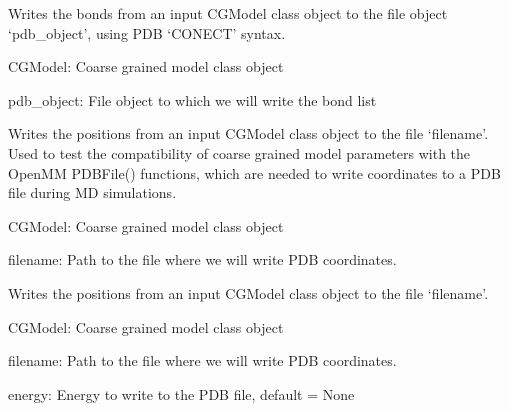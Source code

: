 \documentclass[letterpaper,12pt,english,openany,oneside]{sphinxmanual}
\begin{document}
\label{\detokenize{utilities:module-utilities.iotools}}

\begin{fulllineitems}
\label{\detokenize{utilities:utilities.iotools.write_bonds}}
Writes the bonds from an input CGModel class object to the file object ‘pdb\_object’, using PDB ‘CONECT’ syntax.

CGModel: Coarse grained model class object

pdb\_object: File object to which we will write the bond list

\end{fulllineitems}


\begin{fulllineitems}
\label{\detokenize{utilities:utilities.iotools.write_cg_pdb}}
Writes the positions from an input CGModel class object to the file ‘filename’.  Used to test the compatibility of coarse grained model parameters with the OpenMM PDBFile() functions, which are needed to write coordinates to a PDB file during MD simulations.

CGModel: Coarse grained model class object

filename: Path to the file where we will write PDB coordinates.

\end{fulllineitems}


\begin{fulllineitems}
\label{\detokenize{utilities:utilities.iotools.write_pdbfile_without_topology}}
Writes the positions from an input CGModel class object to the file ‘filename’.

CGModel: Coarse grained model class object

filename: Path to the file where we will write PDB coordinates.

energy: Energy to write to the PDB file, default = None

\end{fulllineitems}
\end{document}
